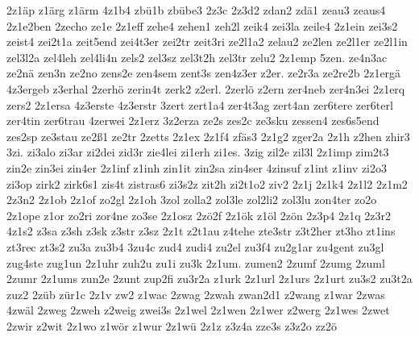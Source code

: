 {2z1äp
z1ärg
z1ärm
4z1b4
zbü1b
zbübe3
2z3c
2z3d2
zdan2
zdä1
zeau3
zeaus4
2z1e2ben
2zecho
ze1e
2z1eff
zehe4
zehen1
zeh2l
zeik4
zei3la
zeile4
2z1ein
zei3s2
zeist4
zei2t1a
zeit5end
zei4t3er
zei2tr
zeit3ri
ze2l1a2
zelau2
ze2len
ze2l1er
ze2l1in
zel3l2a
zel4leh
zel4li4n
zels2
zel3sz
zel3t2h
zel3tr
zelu2
2z1emp
5zen.
ze4n3ac
ze2nä
zen3n
ze2no
zens2e
zen4sem
zent3s
zen4z3er
z2er.
ze2r3a
ze2re2b
2z1ergä
4z3ergeb
z3erhal
2zerhö
zerin4t
zerk2
z2erl.
2zerlö
z2ern
zer4neb
zer4n3ei
2z1erq
zers2
2z1ersa
4z3erste
4z3erstr
3zert
zert1a4
zer4t3ag
zert4an
zer6tere
zer6terl
zer4tin
zer6trau
4zerwei
2z1erz
3z2erza
ze2s
zes2c
ze3sku
zessen4
zes6s5end
zes2sp
ze3stau
ze2ß1
ze2tr
2zetts
2z1ex
2z1f4
zfäs3
2z1g2
zger2a
2z1h
z2hen
zhir3
3zi.
zi3alo
zi3ar
zi2dei
zid3r
zie4lei
zi1erh
zi1es.
3zig
zil2e
zil3l
2z1imp
zim2t3
zin2e
zin3ei
zin4er
2z1inf
z1inh
zin1it
zin2sa
zin4ser
4zinsuf
z1int
z1inv
zi2o3
zi3op
zirk2
zirk6s1
zis4t
zistras6
zi3s2z
zit2h
zi2t1o2
ziv2
2z1j
2z1k4
2z1l2
2z1m2
2z3n2
2z1ob
2z1of
zo2gl
2z1oh
3zol
zolla2
zol3le
zol2li2
zol3lu
zon4ter
zo2o
2z1ope
z1or
zo2ri
zor4ne
zo3se
2z1osz
2zö2f
2z1ök
z1öl
2zön
2z3p4
2z1q
2z3r2
4z1s2
z3sa
z3sh
z3sk
z3str
z3sz
2z1t
z2t1au
z4tehe
zte3str
z3t2her
zt3ho
zt1ins
zt3rec
zt3s2
zu3a
zu3b4
3zu4c
zud4
zudi4
zu2el
zu3f4
zu2g1ar
zu4gent
zu3gl
zug4ste
zug1un
2z1uhr
zuh2u
zu1i
zu3k
2z1um.
zumen2
2zumf
2zumg
2zuml
2zumr
2z1ums
zun2e
2zunt
zup2fi
zu3r2a
z1urk
2z1url
2z1urs
2z1urt
zu3s2
zu3t2a
zuz2
2züb
zür1c
2z1v
zw2
z1wac
2zwag
2zwah
zwan2d1
z2wang
z1war
2zwas
4zwäl
2zweg
2zweh
z2weig
zwei3s
2z1wel
2z1wen
2z1wer
z2werg
2z1wes
2zwet
2zwir
z2wit
2z1wo
z1wör
z1wur
2z1wü
2z1z
z3z4a
zze3s
z3z2o
zz2ö
}

\endinput

